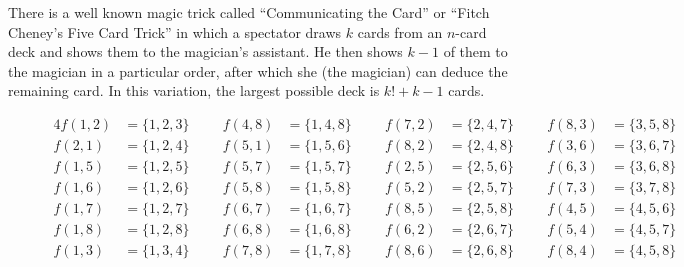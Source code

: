 \documentclass{article}
\begin{document}
There is a well known magic trick called ``Communicating the Card''
or ``Fitch Cheney's Five Card Trick'' in which
a spectator draws $k$ cards from an $n$-card deck and shows them to the
magician's assistant. He then shows $k-1$ of them to the magician
in a particular order, after which she (the magician) can deduce the remaining
card. In this variation, the largest possible deck is $k! + k - 1$ cards.
\begin{figure}[!h]
  \centering
  \begin{alignat*}{4}
    f(1,2) &= \{1,2,3\} \hspace{1cm} f(4,8) &= \{1,4,8\} \hspace{1cm} f(7,2) &= \{2,4,7\} \hspace{1cm} f(8,3) &= \{3,5,8\}\\
    f(2,1) &= \{1,2,4\} \hspace{1cm} f(5,1) &= \{1,5,6\} \hspace{1cm} f(8,2) &= \{2,4,8\} \hspace{1cm} f(3,6) &= \{3,6,7\}\\
    f(1,5) &= \{1,2,5\} \hspace{1cm} f(5,7) &= \{1,5,7\} \hspace{1cm} f(2,5) &= \{2,5,6\} \hspace{1cm} f(6,3) &= \{3,6,8\}\\
    f(1,6) &= \{1,2,6\} \hspace{1cm} f(5,8) &= \{1,5,8\} \hspace{1cm} f(5,2) &= \{2,5,7\} \hspace{1cm} f(7,3) &= \{3,7,8\}\\
    f(1,7) &= \{1,2,7\} \hspace{1cm} f(6,7) &= \{1,6,7\} \hspace{1cm} f(8,5) &= \{2,5,8\} \hspace{1cm} f(4,5) &= \{4,5,6\}\\
    f(1,8) &= \{1,2,8\} \hspace{1cm} f(6,8) &= \{1,6,8\} \hspace{1cm} f(6,2) &= \{2,6,7\} \hspace{1cm} f(5,4) &= \{4,5,7\}\\
    f(1,3) &= \{1,3,4\} \hspace{1cm} f(7,8) &= \{1,7,8\} \hspace{1cm} f(8,6) &= \{2,6,8\} \hspace{1cm} f(8,4) &= \{4,5,8\}\\

\end{alignat*}
\end{figure}
\end{document}
